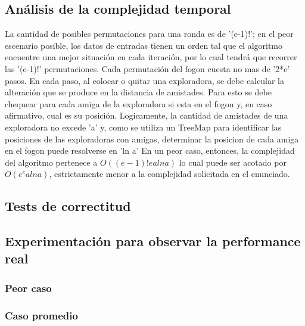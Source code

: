 \subsection{Análisis de la complejidad temporal}
La cantidad de posibles permutaciones para una ronda es de '(e-1)!'; en el peor escenario posible, los datos de entradas tienen un orden tal que el algoritmo encuentre una mejor situación en cada iteración, por lo cual tendrá que recorrer las '(e-1)!' permutaciones. 
Cada permutación del fogon cuesta no mas de '2*e' pasos. En cada paso, al colocar o quitar una exploradora, se debe calcular la alteración que se produce en la distancia de amistades. Para esto se debe chequear para cada amiga de la exploradora si esta en el fogon y, en caso afirmativo, cual es su posición. Logicamente, la cantidad de amistades de una exploradora no excede 'a' y, como se utiliza un TreeMap para identificar las posiciones de las exploradoras con amigas, determinar la posicion de cada amiga en el fogon puede resolverse en 'ln a'
En un peor caso, entonces, la complejidad del algoritmo pertenece a $O( (e-1)! e a ln a)$ lo cual puede ser acotado por $O(e^e a lna)$, estrictamente menor a la complejidad solicitada en el enunciado.

\subsection{Tests de correctitud}

\subsection{Experimentación para observar la performance real}

\subsubsection{Peor caso}

\subsubsection{Caso promedio}
